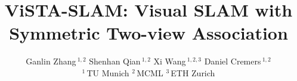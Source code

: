 \documentclass[10pt,twocolumn,letterpaper,dvipsnames,table]{article}
\title{ViSTA-SLAM: Visual SLAM with Symmetric Two-view Association}
\author{Ganlin Zhang$^{~1,2}$
\quad
Shenhan Qian$^{~1,2}$
\quad
Xi Wang$^{~1,2,3}$
\quad
Daniel Cremers$^{~1,2}$
\vspace{0.3em}\\  $^{1~}$TU Munich \qquad $^{2~}$MCML \qquad $^{3~}$ETH Zurich
}
\newcommand{\1}[1]{\mathds{1}_{\{#1\}}}
\begin{document}
\maketitle



% 



{
    \clearpage
    \small
    
    
}

\end{document}
